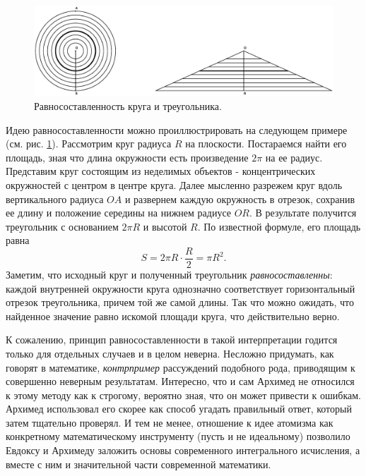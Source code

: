 \begin{figure}[t]
   \centering
   \includegraphics[scale=0.44]{images/archimed_1}
   \caption{Равносоставленность круга и треугольника.}
   \label{fig:archimed_1}
\end{figure}

Идею равносоставленности можно проиллюстрировать на следующем примере (см. рис. \ref{fig:archimed_1}).
Рассмотрим круг радиуса $R$ на плоскости.
Постараемся найти его площадь, зная что длина окружности есть произведение $2\pi$ на ее радиус.
Представим круг состоящим из неделимых объектов - концентрических окружностей с центром в центре круга.
Далее мысленно разрежем круг вдоль вертикального радиуса $OA$ и развернем каждую окружность в отрезок, сохранив ее длину и положение середины на нижнем радиусе $OR$.
В результате получится треугольник с основанием $2\pi R$ и высотой $R$.
По известной формуле, его площадь равна
$$
S = 2\pi R\cdot\frac{R}{2} = \pi R^2.
$$
Заметим, что исходный круг и полученный треугольник \textit{равносоставленны}: каждой внутренней окружности круга однозначно соответствует горизонтальный отрезок треугольника, причем той же самой длины.
Так что можно ожидать, что найденное значение равно искомой площади круга, что действительно верно.

К сожалению, принцип равносоставленности в такой интерпретации годится только для отдельных случаев и в целом неверна. 
Несложно придумать, как говорят в математике, \textit{контрпример} рассуждений подобного рода, приводящим к совершенно неверным результатам.
Интересно, что и сам Архимед не относился к этому методу как к строгому, вероятно зная, что он может привести к ошибкам.
Архимед использовал его скорее как способ угадать правильный ответ, который затем тщательно проверял.
И тем не менее, отношение к идее атомизма как конкретному математическому инструменту (пусть и не идеальному) позволило Евдоксу и Архимеду заложить основы современного интегрального исчисления, а вместе с ним и значительной части современной математики.

